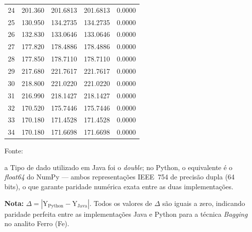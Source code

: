 \begin{table}[H]
\begin{threeparttable}
{\begin{tabular}{
    S[table-format=2.0]
    S[table-format=3.3]
    S[table-format=3.4]
    S[table-format=3.4]
    S[table-format=1.4]
}
 24 & 201.360 & 201.6813 & 201.6813 & 0.0000 \\
 25 & 130.950 & 134.2735 & 134.2735 & 0.0000 \\
 26 & 132.830 & 133.0646 & 133.0646 & 0.0000 \\
 27 & 177.820 & 178.4886 & 178.4886 & 0.0000 \\
 28 & 177.850 & 178.7110 & 178.7110 & 0.0000 \\
 29 & 217.680 & 221.7617 & 221.7617 & 0.0000 \\
 30 & 218.800 & 221.0220 & 221.0220 & 0.0000 \\
 31 & 216.990 & 218.1427 & 218.1427 & 0.0000 \\
 32 & 170.520 & 175.7446 & 175.7446 & 0.0000 \\
 33 & 170.180 & 171.4528 & 171.4528 & 0.0000 \\
 34 & 170.180 & 171.6698 & 171.6698 & 0.0000 \\
\bottomrule
\end{tabular}%
}
\begin{center}
\begin{minipage}{0.85\linewidth}
\begin{tablenotes}
\footnotesize
\item Fonte:~\oautor
\item[a] Tipo de dado utilizado em Java foi o \textit{double}; no Python,
o equivalente é o \textit{float64} do NumPy — ambos representações IEEE~754
de precisão dupla (64 bits), o que garante paridade numérica exata entre as
duas implementações.
\item \textbf{Nota:} $\Delta = |\text{Y}_{\text{Python}} - \text{Y}_{\text{Java}}|$.
Todos os valores de $\Delta$ são iguais a zero, indicando paridade
perfeita entre as implementações Java e Python para a técnica \textit{Bagging}
no analito Ferro (Fe).
\end{tablenotes}
\end{minipage}
\end{center}
\end{threeparttable}
\end{table}


